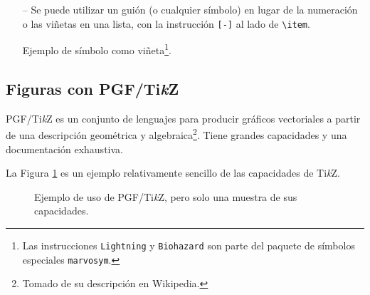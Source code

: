 \begin{enumerate}
\verb+\newcommand{\EIEx}{\textsc{Escuela \Lightning~ Ingeniería Eléctrica}}+ 

y así se crea el comando \verb+\EIEx+ que genera: \EIEx.
\item[--] Se puede utilizar un guión (o cualquier símbolo) en lugar de la numeración o las viñetas en una lista, con la instrucción \verb+[-]+ al lado de \verb+\item+.
\item[\Biohazard] Ejemplo de símbolo como viñeta\footnote{Las instrucciones \texttt{Lightning} y \texttt{Biohazard} son parte del paquete de símbolos especiales \texttt{marvosym}.}.
\end{enumerate}

\subsection{Figuras con PGF/Ti\textit{k}Z}

PGF/Ti\textit{k}Z es un conjunto de lenguajes para producir gráficos vectoriales a partir de una descripción geométrica y algebraica\footnote{Tomado de su descripción en Wikipedia.}. Tiene grandes capacidades y una documentación exhaustiva.

La Figura \ref{F:tikz} es un ejemplo relativamente sencillo de las capacidades de Ti\textit{k}Z.

\begin{figure}[H]
\centering
\caption[Ejemplo de uso de PGF/Ti\textit{k}Z]{Ejemplo de uso de PGF/Ti\textit{k}Z, pero solo una muestra de sus capacidades.}
\label{F:tikz}
\end{figure}

